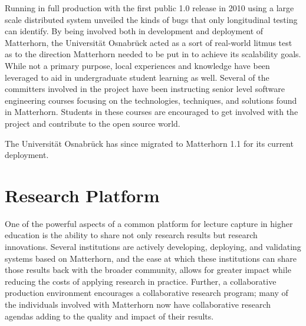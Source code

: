 \documentclass[letterpaper]{sig-alternate}
\begin{document}
Running in full production with the first public 1.0 release in 2010 using a large scale distributed system unveiled the kinds of bugs that only longitudinal testing can identify.  By being involved both in development and deployment of Matterhorn, the Universit\"{a}t Osnabr\"{u}ck acted as a sort of real-world litmus test as to the direction Matterhorn needed to be put in to achieve its scalability goals.  While not a primary purpose, local experiences and knowledge have been leveraged to aid in undergraduate student learning as well.  Several of the committers involved in the project have been instructing senior level software engineering courses focusing on the technologies, techniques, and solutions found in Matterhorn.  Students in these courses are encouraged to get involved with the project and contribute to the open source world.

The Universit\"{a}t Osnabr\"{u}ck has since migrated to Matterhorn 1.1 for its current deployment.

\section{Research Platform}
One of the powerful aspects of a common platform for lecture capture in higher education is the ability to share not only research results but research innovations.  Several institutions are actively developing, deploying, and validating systems based on Matterhorn, and the ease at which these institutions can share those results back with the broader community, allows for greater impact while reducing the costs of applying research in practice.  Further, a collaborative production environment encourages a collaborative research program; many of the individuals involved with Matterhorn now have collaborative research agendas adding to the quality and impact of their results.
\end{document}
